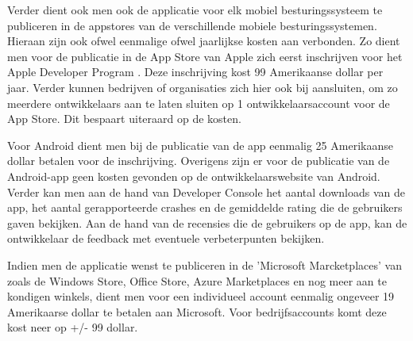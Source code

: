 Verder dient ook men ook de applicatie voor elk mobiel besturingssysteem te publiceren in de appstores van de verschillende
mobiele besturingssystemen. Hieraan zijn ook ofwel eenmalige ofwel jaarlijkse kosten aan verbonden. Zo dient men voor de publicatie in de App Store van Apple zich eerst inschrijven voor het
Apple Developer Program \citep{appledeveloperprograms2017} . Deze inschrijving kost 99 Amerikaanse dollar per jaar. Verder kunnen bedrijven of organisaties
zich hier ook bij aansluiten, om zo meerdere ontwikkelaars aan te laten sluiten op 1 ontwikkelaarsaccount voor de App Store.
Dit bespaart uiteraard op de kosten.

Voor Android dient men bij de publicatie van de app \citep{getstartedwithpublishingandroiddevelopers2017} eenmalig 25 Amerikaanse dollar betalen voor de inschrijving.
Overigens zijn er voor de publicatie van de Android-app geen kosten gevonden op de ontwikkelaarswebsite van Android.
Verder kan men aan de hand van Developer Console het aantal downloads van de app, het aantal gerapporteerde crashes en de gemiddelde rating die de gebruikers gaven bekijken.
Aan de hand van de recensies die de gebruikers op de app, kan de ontwikkelaar de feedback met eventuele verbeterpunten bekijken.

Indien men de applicatie wenst te publiceren in de 'Microsoft Marcketplaces' van \cite{registerasanappdeveloper2017}
 zoals de Windows Store, Office Store, Azure Marketplaces en nog meer aan te kondigen winkels, dient men voor een individueel account
 eenmalig ongeveer 19 Amerikaarse dollar te betalen aan Microsoft. Voor bedrijfsaccounts komt deze kost neer op +/- 99 dollar.

